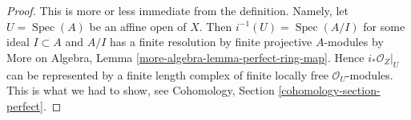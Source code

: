 \documentclass[10pt,a4paper]{amsart}
\theoremstyle{plain}
\theoremstyle{definition}
\theoremstyle{remark}
\numberwithin{equation}{subsection}
\def\Spec{\mathop{\mathrm{Spec}}}
\begin{document}
\begin{proof}
This is more or less immediate from the definition. Namely, let
$U = \Spec(A)$ be an affine open of $X$. Then $i^{-1}(U) = \Spec(A/I)$
for some ideal $I \subset A$ and $A/I$ has a finite resolution by
finite projective $A$-modules by
More on Algebra, Lemma \ref{more-algebra-lemma-perfect-ring-map}.
Hence $i_*\mathcal{O}_Z|_U$ can be represented by a finite
length complex of finite locally free $\mathcal{O}_U$-modules.
This is what we had to show, see
Cohomology, Section \ref{cohomology-section-perfect}.
\end{proof}
\end{document}
